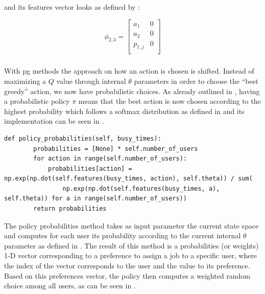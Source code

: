 \documentclass[draft=false]{seal_thesis}
\begin{document}
and its features vector looks as defined by :

\begin{equation}
\label{eq:kbatch_features_ex}
	\phi_{2,3} = 
	\begin{bmatrix}
	a_1 & 0 \\
	a_2 & 0 \\
	p_{1,j} & 0 \\
	\end{bmatrix}
\end{equation}

\subsubsection{}

With \gls{pg} methods the approach on how an action is chosen is shifted. Instead of maximizing a $Q$ value through internal $\theta$ parameters in order to choose the ``best greedy'' action, we now have probabilistic choices. As already outlined in , having a probabilistic policy $\pi$ means that the best action is now chosen according to the highest probability which follows a softmax distribution as defined in  and its implementation can be seen in .

\begin{lstlisting}[caption=Softmax distribution of preferences probabilities,label=lst:softmax_probabilities,style=CustomPython]
    def policy_probabilities(self, busy_times):
        probabilities = [None] * self.number_of_users
        for action in range(self.number_of_users):
            probabilities[action] = np.exp(np.dot(self.features(busy_times, action), self.theta)) / sum(
                np.exp(np.dot(self.features(busy_times, a), self.theta)) for a in range(self.number_of_users))
        return probabilities
\end{lstlisting}

The policy probabilities method takes as input parameter the current state space and computes for each user its probability according to the current internal $\theta$ parameter as defined in . The result of this method is a probabilities (or weights) 1-D vector corresponding to a preference to assign a job to a specific user, where the index of the vector corresponds to the user and the value to its preference. Based on this preferences vector, the policy then computes a weighted random choice among all users, as can be seen in .
\end{document}

